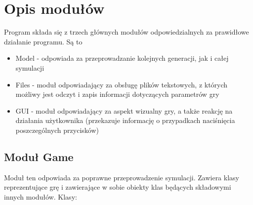 \documentclass[10pt, oneside]{article}
\begin{document}
\section{Opis modułów}
Program składa się z trzech głównych modułów odpowiedzialnych za prawidłowe działanie programu. Są to
\begin {itemize}
\item Model -  odpowiada za przeprowadzanie kolejnych generacji, jak i całej symulacji
\item Files - moduł odpowiadający za obsługę plików tekstowych, z których możliwy jest odczyt i zapis informacji dotyczących parametrów gry
\item GUI - moduł odpowiadający za aspekt wizualny gry, a także reakcję na działania użytkownika (przekazuje informację o przypadkach naciśnięcia poszczególnych przycisków)
\end{itemize}

\subsection{Moduł Game}
Moduł ten odpowiada za poprawne przeprowadzenie symulacji. Zawiera klasy reprezentujące grę i zawierające w sobie obiekty klas będących składowymi innych modułów.
Klasy:
\end{document}
